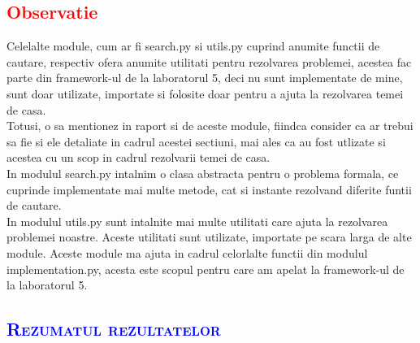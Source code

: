 \documentclass{article}
\begin{document}
\begin{flushleft}
\subsection*{\textcolor{red}{Observatie}}
\vspace{3mm}
\quad Celelalte module, cum ar fi search.py si utils.py cuprind anumite functii de cautare, respectiv ofera anumite utilitati pentru rezolvarea problemei, acestea fac parte din framework-ul de la laboratorul 5, deci nu sunt implementate de mine, sunt doar utilizate, importate si folosite doar pentru a ajuta la rezolvarea temei de casa.
\newline \\
Totusi, o sa mentionez in raport si de aceste module, fiindca consider ca ar trebui sa fie si ele detaliate in cadrul acestei sectiuni, mai ales ca au fost utlizate si acestea cu un scop in cadrul rezolvarii temei de casa.
\newline \\
In modulul search.py intalnim o clasa abstracta pentru o problema formala, ce cuprinde implementate mai multe metode, cat si instante rezolvand diferite funtii de cautare.\\
In modulul utils.py sunt intalnite mai multe utilitati care ajuta la rezolvarea problemei noastre. Aceste utilitati sunt utilizate, importate pe scara larga de alte module. Aceste module ma ajuta in cadrul celorlalte functii din modulul implementation.py, acesta este scopul pentru care am apelat la framework-ul de la laboratorul 5.\par
\end{flushleft}
\newpage
\begin{flushleft}
\begin{center}
     \textcolor{blue}{\section{\bfseries\scshape\textcolor{blue}{Rezumatul rezultatelor}}}
     \vspace{15mm}
\end{center}
\end{flushleft}
\end{document}
